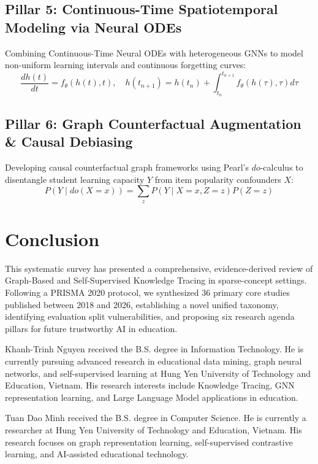 \documentclass[10pt,journal,compsoc]{IEEEtran}
\begin{document}
\subsection{Pillar 5: Continuous-Time Spatiotemporal Modeling via Neural ODEs}
Combining Continuous-Time Neural ODEs with heterogeneous GNNs to model non-uniform learning intervals and continuous forgetting curves:
\begin{equation}
\frac{dh(t)}{dt} = f_\theta(h(t), t), \quad h(t_{n+1}) = h(t_n) + \int_{t_n}^{t_{n+1}} f_\theta(h(\tau), \tau) d\tau
\end{equation}

\subsection{Pillar 6: Graph Counterfactual Augmentation \& Causal Debiasing}
Developing causal counterfactual graph frameworks using Pearl's $do$-calculus to disentangle student learning capacity $Y$ from item popularity confounders $X$:
\begin{equation}
P(Y \mid do(X = x)) = \sum_{z} P(Y \mid X = x, Z = z) P(Z = z)
\end{equation}

\section{Conclusion}
This systematic survey has presented a comprehensive, evidence-derived review of Graph-Based and Self-Supervised Knowledge Tracing in sparse-concept settings. Following a PRISMA 2020 protocol, we synthesized 36 primary core studies published between 2018 and 2026, establishing a novel unified taxonomy, identifying evaluation split vulnerabilities, and proposing six research agenda pillars for future trustworthy AI in education.




\begin{IEEEbiographynophoto}{Khanh-Trinh Nguyen}
received the B.S. degree in Information Technology. He is currently pursuing advanced research in educational data mining, graph neural networks, and self-supervised learning at Hung Yen University of Technology and Education, Vietnam. His research interests include Knowledge Tracing, GNN representation learning, and Large Language Model applications in education.
\end{IEEEbiographynophoto}

\begin{IEEEbiographynophoto}{Tuan Dao Minh}
received the B.S. degree in Computer Science. He is currently a researcher at Hung Yen University of Technology and Education, Vietnam. His research focuses on graph representation learning, self-supervised contrastive learning, and AI-assisted educational technology.
\end{IEEEbiographynophoto}
\end{document}
